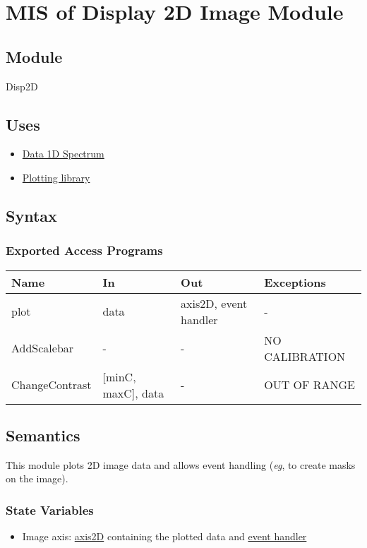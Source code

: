 \documentclass[12pt, titlepage]{article}
\begin{document}
\section{MIS of Display 2D Image Module} \label{Mod:Disp2D}

\subsection{Module}

Disp2D

\subsection{Uses}
\begin{itemize}
    \item \hyperref[Mod:Spectrum]{Data 1D Spectrum}
    \item \hyperref[Mod:Plotting]{Plotting library}
\end{itemize}

\subsection{Syntax}

\subsubsection{Exported Access Programs}

\begin{center}
    \begin{tabular}{p{4cm} p{3cm} p{3cm} p{4cm}}
        \hline
        \textbf{Name} & \textbf{In} & \textbf{Out} & \textbf{Exceptions} \\
        \hline
        plot & data & axis2D, event handler & - \\
        AddScalebar & - & - & NO CALIBRATION \\
        ChangeContrast & [minC, maxC], data & - & OUT OF RANGE \\
        \hline
    \end{tabular}
\end{center}

\subsection{Semantics}
This module plots 2D image data and allows event handling (\textit{eg}, to create masks on the image).

\subsubsection{State Variables}
\begin{itemize}
    \item Image axis: \hyperref[Mod:Plotting]{axis2D} containing the plotted data and \hyperref[Mod:Plotting]{event handler}
\end{itemize}
\end{document}
